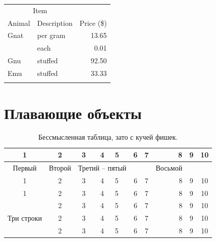 \documentclass[a4paper,12pt]{article}
\begin{document}
\begin{tabular}{llr}
	\hline
	\multicolumn{2}{c}{Item} & \\
	\cline{1-2}
	Animal    & Description & Price (\$) \\
	\hline
	Gnat      & per gram    & 13.65      \\
	& each        & 0.01       \\
	Gnu       & stuffed     & 92.50      \\
	Emu       & stuffed     & 33.33      \\
	\hline& 
\end{tabular}


\section{Плавающие объекты}

\begin{table}[!h] %
	\begin{center} %
		\caption[Заголовок для списка таблиц]{Бессмысленная таблица, зато с кучей фишек.}\label{tab:mytab}
		\begin{tabular}{|c|c|c|c||l|c|c|r|c|c|}
			\hline
			1 & 2 & 3 & 4 & 5 & 6 & 7 & 8 & 9 & 10 \\ \hline
			Первый & Второй & \multicolumn{3}{|c|}{Третий -- пятый} &   &  & Восьмой &   &  \\  %
			\cline{1-7} \cline{9-10}
			1 & 2 & 3 & 4 & 5 & 6 & 7 & 8 & 9 & 10 \\ \hline \hline
			1 & 2 & 3 & 4 & 5 & 6 & 7 & 8 & 9 & 10 \\ \hline
			\multirow{3}{*}{Три строки}  & 2 & 3 & 4 & 5 & 6 & 7 & 8 & 9 & 10 \\ \cline{2-10} %
			& 2 & 3 & 4 & 5 & 6 & 7 & 8 & 9 & 10 \\ \cline{2-10}
			& 2 & 3 & 4 & 5 & 6 & 7 & 8 & 9 & 10 \\ \hline
		\end{tabular}
	\end{center}
\end{table}
\end{document}
